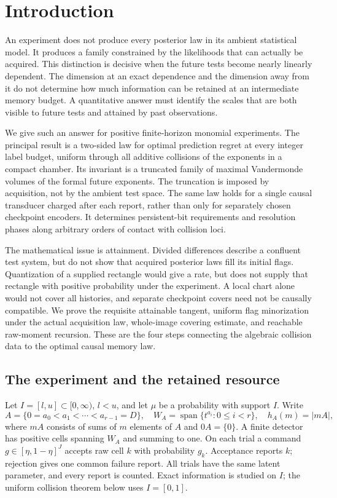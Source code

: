 \section{Introduction}
\label{sec:introduction}
An experiment does not produce every posterior law in its ambient
statistical model. It produces a family constrained by the likelihoods
that can actually be acquired. This distinction is decisive when the
future tests become nearly linearly dependent. The dimension at an
exact dependence and the dimension away from it do not determine how
much information can be retained at an intermediate memory budget.
A quantitative answer must identify the scales that are both visible
to future tests and attained by past observations.

We give such an answer for positive finite-horizon monomial experiments.
The principal result is a two-sided law for optimal prediction regret
at every integer label budget, uniform through all additive collisions
of the exponents in a compact chamber. Its invariant is a truncated
family of maximal Vandermonde volumes of the formal future exponents.
The truncation is imposed by acquisition, not by the ambient test space.
The same law holds for a single causal transducer charged after each
report, rather than only for separately chosen checkpoint encoders.
It determines persistent-bit requirements and resolution phases along
arbitrary orders of contact with collision loci.

The mathematical issue is attainment. Divided differences describe a
confluent test system, but do not show that acquired posterior laws
fill its initial flags. Quantization of a supplied rectangle would give
a rate, but does not supply that rectangle with positive probability
under the experiment. A local chart alone would not cover all histories,
and separate checkpoint covers need not be causally compatible. We prove
the requisite attainable tangent, uniform flag minorization under the
actual acquisition law, whole-image covering estimate, and reachable
raw-moment recursion. These are the four steps connecting the algebraic
collision data to the optimal causal memory law.

\subsection{The experiment and the retained resource}
Let $I=[l,u]\subset[0,\infty)$, $l<u$, and let $\mu$ be a probability
with support $I$. Write
\[
 A=\{0=a_0<a_1<\cdots<a_{r-1}=D\},\quad
 W_A=\operatorname{span}\{t^{a_i}:0\le i<r\},\quad h_A(m)=|mA|,
\]
where $mA$ consists of sums of $m$ elements of $A$ and $0A=\{0\}$.
A finite detector has positive cells spanning $W_A$ and summing to one.
On each trial a command $g\in[\eta,1-\eta]^J$ accepts raw cell $k$
with probability $g_k$. Acceptance reports $k$; rejection gives one
common failure report. All trials have the same latent parameter, and
every report is counted. Exact information is studied on $I$; the
uniform collision theorem below uses $I=[0,1]$.

